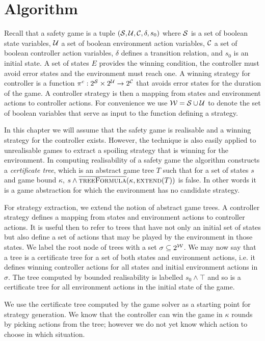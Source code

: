 \section{Algorithm}

Recall that a safety game is a tuple $(\mathcal{S}, \mathcal{U}, \mathcal{C}, \delta, s_0)$ where $\mathcal{S}$ is a set of boolean state variables, $\mathcal{U}$ a set of boolean environment action variables, $\mathcal{C}$ a set of boolean controller action variables, $\delta$ defines a transition relation, and $s_0$ is an initial state. A set of states $E$ provides the winning condition, the controller must avoid error states and the environment must reach one. A winning strategy for controller is a function $\pi^c : 2^{\mathcal{S}} \times 2^{\mathcal{U}} \to 2^{\mathcal{C}}$ that avoids error states for the duration of the game. A controller strategy is then a mapping from states and environment actions to controller actions. For convenience we use $\mathcal{W} = \mathcal{S} \cup \mathcal{U}$ to denote the set of boolean variables that serve as input to the function defining a strategy.

In this chapter we will assume that the safety game is realisable and a winning strategy for the controller exists. However, the technique is also easily applied to unrealisable games to extract a spoiling strategy that is winning for the environment. In computing realisability of a safety game the algorithm constructs a \emph{certificate tree}, which is an abstract game tree $T$ such that for a set of states $s$ and game bound $\kappa$, $s \land \textsc{$\overline{\mbox{treeFormula}}$}(\kappa, \textsc{extend}(T))$ is false. In other words it is a game abstraction for which the environment has no candidate strategy.

For strategy extraction, we extend the notion of abstract game trees. A controller strategy defines a mapping from states and environment actions to controller actions. It is useful then to refer to trees that have not only an initial set of states but also define a set of actions that may be played by the environment in those states.  We label the root node of trees with a set $\sigma \subseteq 2^{\mathcal{W}}$. We may now say that a tree is a certificate tree for a set of both states and environment actions, i.e. it defines winning controller actions for all states and initial environment actions in $\sigma$.  The tree computed by bounded realisability is labelled $s_0 \land \top$ and so is a certificate tree for all environment actions in the initial state of the game.

We use the certificate tree computed by the game solver as a starting point for strategy generation.  We know that the controller can win the game in $\kappa$ rounds by picking actions from the tree; however we do not yet know which action to choose in which situation.



